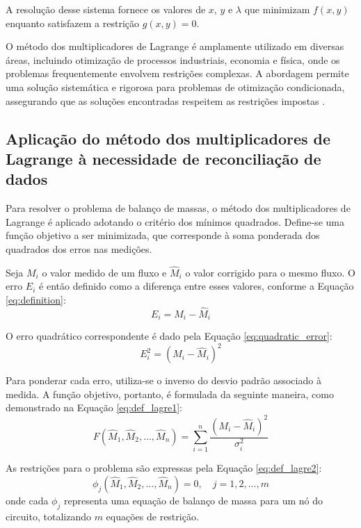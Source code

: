 A resolução desse sistema fornece os valores de $x$, $y$ e $\lambda$ que minimizam $f(x, y)$ enquanto satisfazem a restrição $g(x, y) = 0$.

O método dos multiplicadores de Lagrange é amplamente utilizado em diversas áreas, incluindo otimização de processos industriais, economia e física, onde os problemas frequentemente envolvem restrições complexas. A abordagem permite uma solução sistemática e rigorosa para problemas de otimização condicionada, assegurando que as soluções encontradas respeitem as restrições impostas \cite{lagrangeoptbook}.

\subsection{Aplicação do método dos multiplicadores de Lagrange à necessidade de reconciliação de dados}

Para resolver o problema de balanço de massas, o método dos multiplicadores de Lagrange é aplicado adotando o critério dos mínimos quadrados. Define-se uma função objetivo a ser minimizada, que corresponde à soma ponderada dos quadrados dos erros nas medições.

Seja $M_i$ o valor medido de um fluxo e $\hat{M}_i$ o valor corrigido para o mesmo fluxo. O erro $E_i$ é então definido como a diferença entre esses valores, conforme a Equação \ref{eq:definition}:
\begin{equation}
	E_i = M_i - \hat{M}_i
 \label{eq:definition}
\end{equation}

O erro quadrático correspondente é dado pela Equação \ref{eq:quadratic_error}:
\begin{equation}
	E_i^2 = (M_i - \hat{M}_i)^2
    \label{eq:quadratic_error}
\end{equation}

Para ponderar cada erro, utiliza-se o inverso do desvio padrão associado à medida. A função objetivo, portanto, é formulada da seguinte maneira, como demonstrado na Equação \ref{eq:def_lagre1}:
\begin{equation}
	F(\hat{M}_1, \hat{M}_2, \dots, \hat{M}_n) = \sum_{i=1}^n \frac{(M_i - \hat{M}_i)^2}{\sigma_i^2}
     \label{eq:def_lagre1}
\end{equation}

As restrições para o problema são expressas pela Equação \ref{eq:def_lagre2}:
\begin{equation}
	\phi_j(\hat{M}_1, \hat{M}_2, \dots, \hat{M}_n) = 0, \quad j = 1, 2, \dots, m
     \label{eq:def_lagre2}
\end{equation}
onde cada $\phi_j$ representa uma equação de balanço de massa para um nó do circuito, totalizando $m$ equações de restrição.

